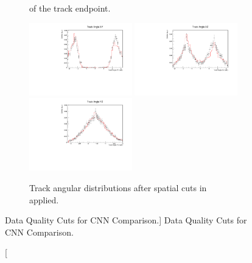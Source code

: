 \begin{figure}
\begin{subfigure}[b]{\textwidth}
{		of the track endpoint.}
		\label{fig:spatial_cuts}
	\end{subfigure}
	\begin{subfigure}[b]{\textwidth}
		\centering
		\vspace{1.5cm}
		\includegraphics[width=0.49\textwidth]{figures/angXY_cuts.pdf}
		\hfill
		\includegraphics[width=0.49\textwidth]{figures/angXZ_cuts.pdf}
		\includegraphics[width=0.49\textwidth]{figures/angYZ_cuts.pdf}
		\caption {Track angular distributions after spatial cuts in 
		 applied.}
		\label{fig:angular_dist}
	\end{subfigure}

	\caption 
	[Data Quality Cuts for CNN Comparison.]
	{Data Quality Cuts for CNN Comparison.}
	\label{fig:cnn_cuts_spatial}

\end{figure}

